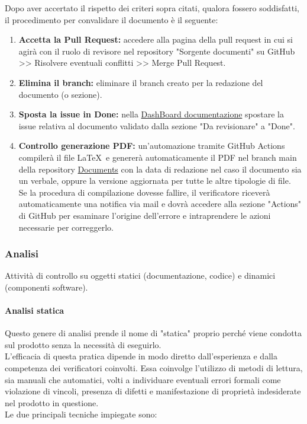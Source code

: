 Dopo aver accertato il rispetto dei criteri sopra citati, qualora fossero soddisfatti, il procedimento per convalidare il documento è il seguente:

\begin{enumerate}
    \item \textbf{Accetta la Pull Request:} 
        accedere alla pagina della pull request in cui si agirà con il ruolo di revisore nel repository "Sorgente documenti" su GitHub >> Risolvere eventuali conflitti >> Merge Pull Request.
    \item \textbf{Elimina il branch:} 
        eliminare il branch creato per la redazione del documento (o sezione).
    \item \textbf{Sposta la issue in Done:} 
        nella \href{https://github.com/orgs/ByteOps-swe/projects/1/views/1}{DashBoard documentazione} spostare la issue relativa al documento validato dalla sezione "Da revisionare" a "Done". 
    \item \textbf{Controllo generazione PDF:} 
        un'automazione tramite GitHub Actions compilerà il file \LaTeX\ e genererà automaticamente il PDF nel branch main della repository \href{https://github.com/ByteOps-swe/Documents}{Documents} con la data di redazione nel caso il documento sia un verbale, oppure la versione aggiornata per tutte le altre tipologie di file. \\
        Se la procedura di compilazione dovesse fallire, il verificatore riceverà automaticamente una notifica via mail e dovrà accedere alla sezione "Actions" di GitHub per esaminare l'origine dell'errore e intraprendere le azioni necessarie per correggerlo.
\end{enumerate}

\subsubsection{Analisi}
Attività di controllo su oggetti statici (documentazione, codice) e dinamici (componenti software).

\paragraph{Analisi statica}
Questo genere di analisi prende il nome di "statica" proprio perché viene condotta sul prodotto senza la necessità di eseguirlo. \\ L'efficacia di questa pratica dipende in modo diretto dall'esperienza e dalla competenza dei verificatori coinvolti. Essa coinvolge l'utilizzo di metodi di lettura, sia manuali che automatici, volti a individuare eventuali errori formali come violazione di vincoli, presenza di difetti e manifestazione di proprietà indesiderate nel prodotto in questione. \\
Le due principali tecniche impiegate sono:

